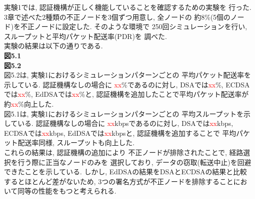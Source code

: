 実験1では, 認証機構が正しく機能していることを確認するための実験を
行った. 3章で述べた2種類の不正ノードを3個ずつ用意し, 全ノードの
約8\%(5個のノード)を不正ノードに設定した. そのような環境で
250回シミュレーションを行い, スループットと平均パケット配送率(PDR)を
調べた. \\
\indent 実験の結果は以下の通りである. \\

{\LARGE\textbf{図5.1}}\\
{\LARGE\textbf{図5.2}}\\

\indent 図5.2は, 実験1におけるシミュレーションパターンごとの
平均パケット配送率を示している. 認証機構なしの場合に
\textcolor{red}{xx}\%であるのに対し, DSAでは\textcolor{red}{xx}\%, 
ECDSAでは\textcolor{red}{xx}\%, EdDSAでは\textcolor{red}{xx}\%と, 
認証機構を追加したことで平均パケット配送率が
約\textcolor{red}{xx}\%向上した. \\
\indent 図5.1は, 実験1におけるシミュレーションパターンごとの
平均スループットを示している. 認証機構なしの場合に
\textcolor{red}{xx}kbpsであるのに対し, 
DSAでは\textcolor{red}{xx}kbps, ECDSAでは\textcolor{red}{xx}kbps,
EdDSAでは\textcolor{red}{xx}kbpsと, 認証機構を追加することで
平均パケット配送率同様, スループットも向上した. \\
\indent これらの結果は, 認証機構の追加により 
不正ノードが排除されたことで, 経路選択を行う際に正当なノードのみを
選択しており,  データの窃取(転送中止)を回避できたことを示している. 
しかし, EdDSAの結果をDSAとECDSAの結果と比較するとほとんど差がないため, 
3つの署名方式が不正ノードを排除することにおいて同等の性能をもつと考えられる. 



